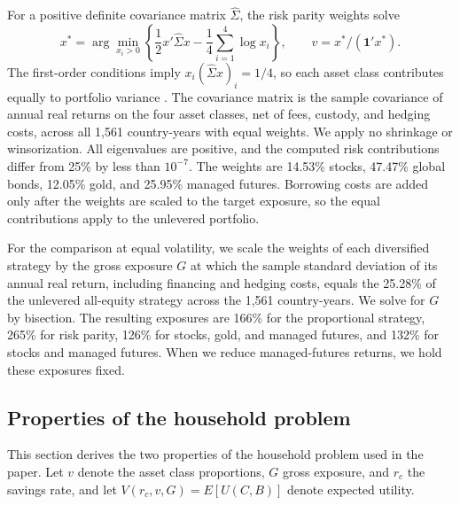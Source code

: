 For a positive definite covariance matrix $\widehat\Sigma$, the risk parity weights solve
\begin{equation}
 x^*=\arg\min_{x_i>0}\left\{\frac12 x'\widehat\Sigma x-\frac14\sum_{i=1}^4\log x_i\right\},\qquad
 v=x^*/(\mathbf1'x^*).
\end{equation}
The first-order conditions imply $x_i(\widehat\Sigma x)_i=1/4$, so each asset class contributes equally to
portfolio variance \citep{MaillardRoncalliTeiletche2010,RoncalliRiskBudgeting2014}. The covariance matrix
is the sample covariance of annual real returns on the four asset classes, net of fees, custody, and
hedging costs, across all 1,561 country-years with equal weights. We apply no shrinkage or winsorization.
All eigenvalues are positive, and the computed risk contributions differ from 25\% by less than $10^{-7}$.
The weights are 14.53\% stocks, 47.47\% global bonds, 12.05\% gold, and 25.95\% managed futures. Borrowing
costs are added only after the weights are scaled to the target exposure, so the equal contributions apply
to the unlevered portfolio.

For the comparison at equal volatility, we scale the weights of each diversified strategy by the gross
exposure $G$ at which the sample standard deviation of its annual real return, including financing and
hedging costs, equals the 25.28\% of the unlevered all-equity strategy across the 1,561 country-years. We
solve for $G$ by bisection. The resulting exposures are 166\% for the proportional strategy, 265\% for
risk parity, 126\% for stocks, gold, and managed futures, and 132\% for stocks and managed futures. When
we reduce managed-futures returns, we hold these exposures fixed.

\subsection{Properties of the household problem}
\label{app:framework}\label{sec:utility-framework}

This section derives the two properties of the household problem used in the paper. Let $v$ denote the
asset class proportions, $G$ gross exposure, and $r_c$ the savings rate, and let
$V(r_c,v,G)=E[U(C,B)]$ denote expected utility.

